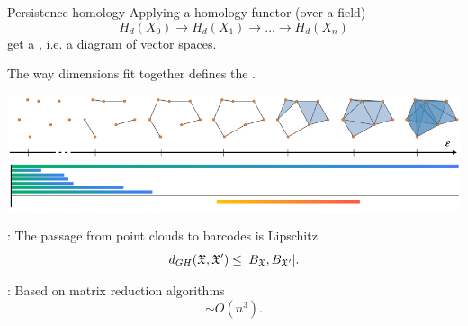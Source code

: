 \begin{frame}{Persistence homology}
	\pause
	Applying a homology functor (over a field)
	\[
	H_d(X_0) \to H_d(X_1) \to\dots\to H_d(X_n)
	\]
	get a , i.e. a diagram of vector spaces.

	\pause\bigskip
	The way dimensions fit together defines the .
	\begin{center}
		\includegraphics[scale=.7]{aux/vietoris-rips}
		\includegraphics[scale=.6]{aux/betti}
	\end{center}

	\pause\smallskip
	: The passage from point clouds to barcodes is Lipschitz
	\[
	d_{GH}(\mathfrak{X}, \mathfrak{X}') \leq \lvert B_{\mathfrak{X}}, B_{\mathfrak{X}'}\rvert.
	\]

	\pause
	: Based on matrix reduction algorithms
	\[
	\sim O(n^3).
	\]
\end{frame}

